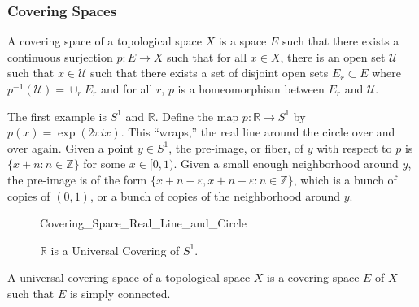 \documentclass[crop=false,class=article,oneside]{standalone}
\begin{document}
        \subsubsection{Covering Spaces}
            \begin{definition}
                A covering space of a
                topological space $X$
                is a space
                $E$ such that there exists
                a continuous surjection
                $p:E\rightarrow{X}$ such that
                for all $x\in{X}$, there is an
                open set $\mathcal{U}$ such that
                $x\in\mathcal{U}$ such that there
                exists a set of disjoint open sets
                $E_{r}\subset{E}$ where
                $p^{-1}(\mathcal{U})=\cup_{r}E_{r}$
                and for all $r$,
                $p$ is a homeomorphism between
                $E_{r}$ and $\mathcal{U}$.
            \end{definition}
            \begin{example}
                The first example is
                $S^{1}$ and $\mathbb{R}$.
                Define the map
                $p:\mathbb{R}\rightarrow{S^{1}}$
                by $p(x)=\exp(2\pi{i}x)$. This ``wraps,''
                the real line around the circle over and over again.
                Given a point $y\in{S^{1}}$, the pre-image, or fiber,
                of $y$ with respect to $p$ is
                $\{x+n:n\in\mathbb{Z}\}$ for some $x\in[0,1)$.
                Given a small enough neighborhood
                around $y$, the pre-image is of the form
                $\{x+n-\varepsilon,x+n+\varepsilon:n\in\mathbb{Z}\}$,
                which is a bunch of copies of $(0,1)$, or a bunch
                of copies of the neighborhood around $y$.
            \end{example}
            \begin{figure}[H]
                \centering
                \captionsetup{type=figure}
                
                          {Covering_Space_Real_Line_and_Circle}
                \caption{$\mathbb{R}$ is a Universal Covering of $S^{1}$.}
                \label{fig:Surgery_Theory_Reals_Cover_Circle}
            \end{figure}
            \begin{definition}
                A universal covering space of a topological space $X$
                is a covering space $E$ of $X$ such that
                $E$ is simply connected.
            \end{definition}
\end{document}
